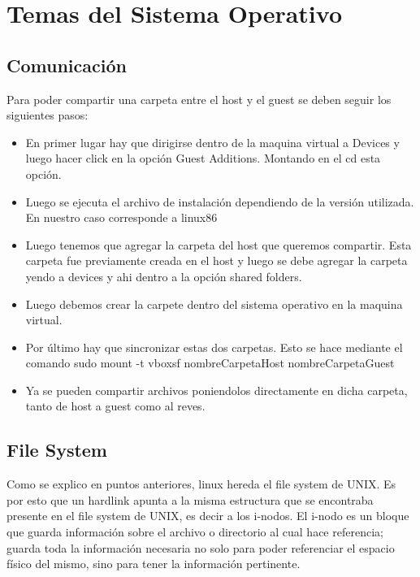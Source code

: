 \documentclass[a4paper, 12pt]{article}
\begin{document}
\section*{Temas del Sistema Operativo}

\subsection*{Comunicaci\'on}

Para poder compartir una carpeta entre el host y el guest se deben seguir los siguientes pasos:

\begin{itemize}
\item En primer lugar hay que dirigirse dentro de la maquina virtual a Devices y luego hacer click en la opci\'on Guest Additions. Montando en el cd esta opci\'on.
\item Luego se ejecuta el archivo de instalaci\'on dependiendo de la versi\'on utilizada. En nuestro caso corresponde a linux86
\item Luego tenemos que agregar la carpeta del host que queremos compartir. Esta carpeta fue previamente creada en el host y luego se debe agregar la carpeta yendo a devices y ahi dentro a la opci\'on shared folders. 
\item Luego debemos crear la carpete dentro del sistema operativo en la maquina virtual.
\item Por \'ultimo hay que sincronizar estas dos carpetas. Esto se hace mediante el comando sudo mount -t vboxsf nombreCarpetaHost nombreCarpetaGuest
\item Ya se pueden compartir archivos poniendolos directamente en dicha carpeta, tanto de host a guest como al reves. 
\end{itemize}


\subsection*{File System}

Como se explico en puntos anteriores, linux hereda el file system de UNIX. Es por esto que un hardlink apunta a la misma estructura que se encontraba presente en el file system de UNIX, es decir a los i-nodos. El i-nodo es un bloque que guarda informaci\'on sobre el archivo o directorio al cual hace referencia; guarda toda la informaci\'on necesaria no solo para poder referenciar el espacio f\'isico del mismo, sino para tener la informaci\'on pertinente. 
\end{document}
